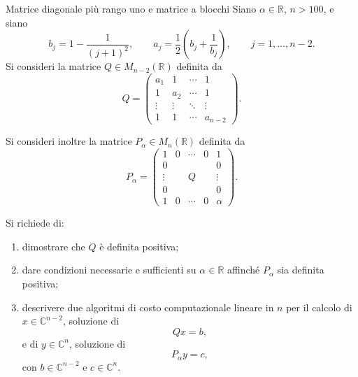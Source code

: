 \documentclass[a4paper]{article}
\begin{document}
\begin{snippetexercise}{Matrice diagonale più rango uno e matrice a blocchi}
    Siano \(\alpha\in\mathbb{R}\), \(n>100\), e siano
    \[
        b_j=1-\frac{1}{(j+1)^2},
        \qquad
        a_j=\frac{1}{2}\left(b_j+\frac{1}{b_j}\right),
        \qquad
        j=1,\dots,n-2.
    \]
    Si consideri la matrice \(Q\in M_{n-2}(\mathbb{R})\) definita da
    \[
        Q=
        \begin{pmatrix}
            a_1 & 1 & \cdots & 1\\
            1 & a_2 & \cdots & 1\\
            \vdots & \vdots & \ddots & \vdots\\
            1 & 1 & \cdots & a_{n-2}
        \end{pmatrix}.
    \]

    Si consideri inoltre la matrice \(P_\alpha\in M_n(\mathbb{R})\) definita da
    \[
        P_\alpha=
        \begin{pmatrix}
            1 & 0 & \cdots & 0 & 1\\
            0 & & & & 0\\
            \vdots & & Q & & \vdots\\
            0 & & & & 0\\
            1 & 0 & \cdots & 0 & \alpha
        \end{pmatrix}.
    \]

    Si richiede di:
    \begin{enumerate}
        \item dimostrare che \(Q\) è definita positiva;
        \item dare condizioni necessarie e sufficienti su \(\alpha\in\mathbb{R}\) affinché \(P_\alpha\) sia definita positiva;
        \item descrivere due algoritmi di costo computazionale lineare in \(n\) per il calcolo di \(x\in\mathbb{C}^{n-2}\), soluzione di
            \[
                Qx=b,
            \]
            e di \(y\in\mathbb{C}^n\), soluzione di
            \[
                P_\alpha y=c,
            \]
            con \(b\in\mathbb{C}^{n-2}\) e \(c\in\mathbb{C}^n\).
    \end{enumerate}
\end{snippetexercise}
\end{document}
